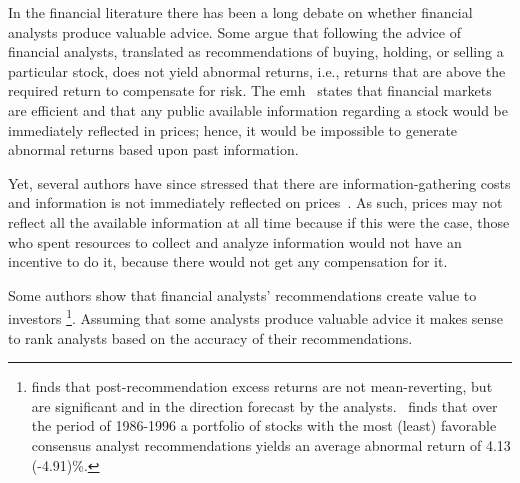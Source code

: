 \documentclass[a4paper,twoside,12pt,openright,notitlepage]{report}\usepackage[]{graphicx}\usepackage[]{color}
\newenvironment{knitrout}{}{} %
\begin{document}
\begin{knitrout}
\color{fgcolor}



\end{knitrout}



In the financial literature there has been a long debate on whether financial analysts produce valuable  advice. Some argue that following the advice of financial analysts,  translated as recommendations of buying, holding, or selling a particular stock, does not yield  abnormal returns, i.e.,  returns that are above the required return to compensate for risk. The \gls{emh}~\citep{fama1970ecm} states that financial markets are efficient and that any public available information  regarding a stock would be immediately reflected in prices; hence, it would be  impossible to generate abnormal returns based upon past information.

Yet, several authors have since stressed that  there are information-gathering costs and information is not immediately reflected on prices~\citep{grossman1980iie}. As such, prices may not  reflect all the available information at all time because if this were the case, those who spent resources to collect and analyze   information would not have an incentive to do it, because there would not get any compensation for it.



Some authors show that financial analysts' recommendations create value to investors \citep{womack1996,barber2001}\footnote{\cite{womack1996} finds that  post-recommendation excess returns are not mean-reverting, but are significant and in the direction forecast by the analysts.~\cite{barber2001} finds that over the period of 1986-1996 a portfolio of stocks with the most (least) favorable consensus analyst recommendations yields an average abnormal return of 4.13 (-4.91)\%.}. Assuming that some analysts produce valuable advice it makes sense to rank analysts based on the accuracy of their recommendations.
\end{document}
